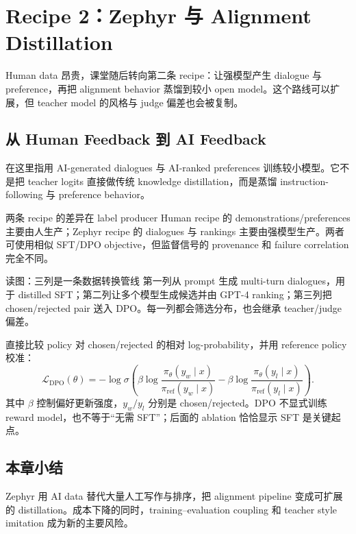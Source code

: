 \section{Recipe 2：Zephyr 与 Alignment Distillation}

Human data 昂贵，课堂随后转向第二条 recipe：让强模型产生 dialogue 与 preference，再把 alignment behavior 蒸馏到较小 open model。这个路线可以扩展，但 teacher model 的风格与 judge 偏差也会被复制。

\subsection{从 Human Feedback 到 AI Feedback}

在这里指用 AI-generated dialogues 与 AI-ranked preferences 训练较小模型。它不是把 teacher logits 直接做传统 knowledge distillation，而是蒸馏 instruction-following 与 preference behavior。


\begin{importantbox}{两条 recipe 的差异在 label producer}
Human recipe 的 demonstrations/preferences 主要由人生产；Zephyr recipe 的 dialogues 与 rankings 主要由强模型生产。两者可使用相似 SFT/DPO objective，但监督信号的 provenance 和 failure correlation 完全不同。
\end{importantbox}


\begin{knowledgebox}{读图：三列是一条数据转换管线}
第一列从 prompt 生成 multi-turn dialogues，用于 distilled SFT；第二列让多个模型生成候选并由 GPT-4 ranking；第三列把 chosen/rejected pair 送入 DPO。每一列都会筛选分布，也会继承 teacher/judge 偏差。
\end{knowledgebox}

直接比较 policy 对 chosen/rejected 的相对 log-probability，并用 reference policy 校准：
\[
\mathcal{L}_{\mathrm{DPO}}(\theta)
=-\log\sigma\!\left(
\beta\log\frac{\pi_{\theta}(y_w\mid x)}{\pi_{\mathrm{ref}}(y_w\mid x)}
-\beta\log\frac{\pi_{\theta}(y_l\mid x)}{\pi_{\mathrm{ref}}(y_l\mid x)}
\right).
\]
其中 $\beta$ 控制偏好更新强度，$y_w/y_l$ 分别是 chosen/rejected。DPO 不显式训练 reward model，也不等于“无需 SFT”；后面的 ablation 恰恰显示 SFT 是关键起点。


\subsection{本章小结}

Zephyr 用 AI data 替代大量人工写作与排序，把 alignment pipeline 变成可扩展的 distillation。成本下降的同时，training--evaluation coupling 和 teacher style imitation 成为新的主要风险。

